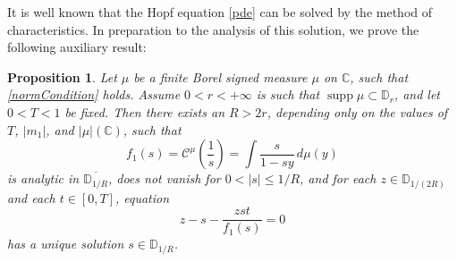 \documentclass[reqno,11pt]{amsart}
\theoremstyle{plain}
\newtheorem{prop}[thm]{Proposition}
\theoremstyle{definition}
\theoremstyle{remark}
\numberwithin{equation}{section}
\numberwithin{equation}{section}
\DeclareMathOperator{\supp}{supp}
\newcommand{\C}{\mathbb{C}}
\newcommand{\D}{\mathbb{D}}
\begin{document}
It is well known that the Hopf equation \eqref{pde} can be solved by the method of characteristics. In preparation to the analysis of this solution, we prove the following auxiliary result: 
\begin{prop} \label{prop:solutionPDE}
Let $\mu$ be a finite Borel signed measure $\mu$ on $\C$, such that \eqref{normCondition} holds. 
Assume $0<r<+\infty$ is such that $\supp \mu \subset\D_r$, and let $0<T<1$ be fixed. Then there exists an $R> 2r$, depending only on the values of $T$, $|m_1|$, and $|\mu| (\C)$, such that 
\begin{equation*}
    f_1 (s) = \mathcal C^\mu\left(\frac{1}{s}\right)= \int \frac{s}{1-s y} \, d\mu(y)
\end{equation*}
is analytic in $\overline{\D_{1/R}}$, does not vanish for $0<|s|\le  1/R$, and for each $z\in \D_{1/(2R)}$ and each $t\in [0,T]$, equation 
	\begin{equation} \label{main}
		z -  s- \frac{z s t}{f_1 (s)}=0
	\end{equation}
	has a unique solution $s\in \D_{1/R}$. 
\end{prop}
\end{document}
